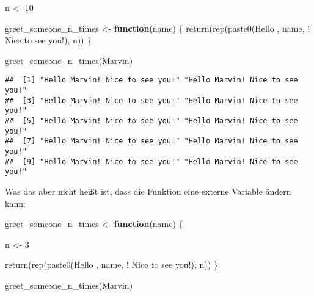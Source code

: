 \documentclass[
]{book}
\newenvironment{Shaded}{\begin{snugshade}}{\end{snugshade}}
\newcommand{\ControlFlowTok}[1]{\textcolor[rgb]{0.13,0.29,0.53}{\textbf{#1}}}
\newcommand{\DecValTok}[1]{\textcolor[rgb]{0.00,0.00,0.81}{#1}}
\newcommand{\FunctionTok}[1]{\textcolor[rgb]{0.00,0.00,0.00}{#1}}
\newcommand{\NormalTok}[1]{#1}
\newcommand{\OtherTok}[1]{\textcolor[rgb]{0.56,0.35,0.01}{#1}}
\newcommand{\StringTok}[1]{\textcolor[rgb]{0.31,0.60,0.02}{#1}}
\begin{document}
\begin{Shaded}
\begin{Highlighting}[]
\NormalTok{n }\OtherTok{\textless{}{-}} \DecValTok{10}

\NormalTok{greet\_someone\_n\_times }\OtherTok{\textless{}{-}} \ControlFlowTok{function}\NormalTok{(name) \{}
  \FunctionTok{return}\NormalTok{(}\FunctionTok{rep}\NormalTok{(}\FunctionTok{paste0}\NormalTok{(}\StringTok{\textquotesingle{}Hello \textquotesingle{}}\NormalTok{, }
\NormalTok{                    name, }
                    \StringTok{\textquotesingle{}! Nice to see you!\textquotesingle{}}\NormalTok{), }
\NormalTok{             n))}
\NormalTok{\}}

\FunctionTok{greet\_someone\_n\_times}\NormalTok{(}\StringTok{\textquotesingle{}Marvin\textquotesingle{}}\NormalTok{)}
\end{Highlighting}
\end{Shaded}

\begin{verbatim}
##  [1] "Hello Marvin! Nice to see you!" "Hello Marvin! Nice to see you!"
##  [3] "Hello Marvin! Nice to see you!" "Hello Marvin! Nice to see you!"
##  [5] "Hello Marvin! Nice to see you!" "Hello Marvin! Nice to see you!"
##  [7] "Hello Marvin! Nice to see you!" "Hello Marvin! Nice to see you!"
##  [9] "Hello Marvin! Nice to see you!" "Hello Marvin! Nice to see you!"
\end{verbatim}

Was das aber nicht heißt ist, dass die Funktion eine externe Variable ändern kann:

\begin{Shaded}
\begin{Highlighting}[]
\NormalTok{greet\_someone\_n\_times }\OtherTok{\textless{}{-}} \ControlFlowTok{function}\NormalTok{(name) \{}
  
\NormalTok{  n }\OtherTok{\textless{}{-}} \DecValTok{3}
  
  \FunctionTok{return}\NormalTok{(}\FunctionTok{rep}\NormalTok{(}\FunctionTok{paste0}\NormalTok{(}\StringTok{\textquotesingle{}Hello \textquotesingle{}}\NormalTok{, }
\NormalTok{                    name, }
                    \StringTok{\textquotesingle{}! Nice to see you!\textquotesingle{}}\NormalTok{), }
\NormalTok{             n))}
\NormalTok{\}}

\FunctionTok{greet\_someone\_n\_times}\NormalTok{(}\StringTok{\textquotesingle{}Marvin\textquotesingle{}}\NormalTok{)}
\end{Highlighting}
\end{Shaded}
\end{document}
